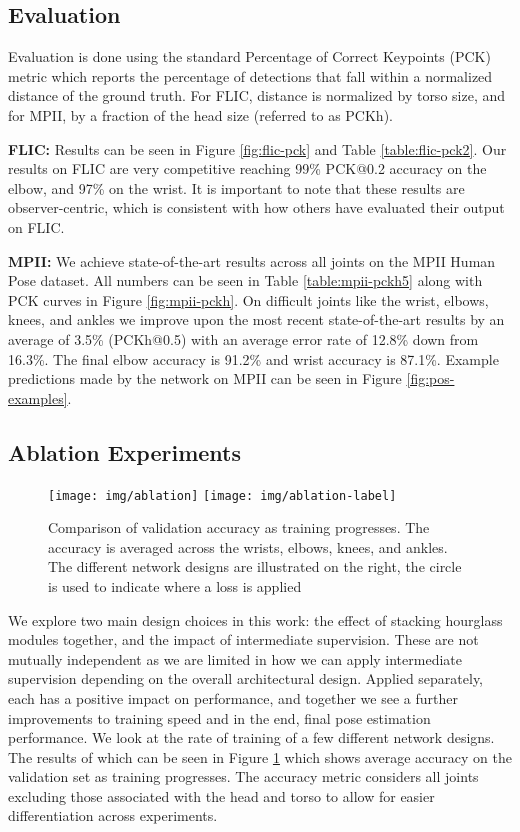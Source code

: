 \documentclass[runningheads]{llncs}
\begin{document}
\subsection{Evaluation}

Evaluation is done using the standard Percentage of Correct Keypoints
(PCK) metric which reports the percentage of detections that fall
within a normalized distance of the ground truth. For FLIC, distance
is normalized by torso size, and for MPII, by a fraction of the head
size (referred to as PCKh).

\textbf{FLIC:} Results can be seen in Figure \ref{fig:flic-pck} and
Table \ref{table:flic-pck2}.  Our results on FLIC are very competitive
reaching 99\% PCK@0.2 accuracy on the elbow, and 97\% on the wrist. It
is important to note that these results are observer-centric, which is
consistent with how others have evaluated their output on
FLIC.

\textbf{MPII:} We achieve state-of-the-art results across all joints
on the MPII Human Pose dataset. All numbers can be seen in Table
\ref{table:mpii-pckh5} along with PCK curves in Figure
\ref{fig:mpii-pckh}. On difficult joints like the wrist, elbows,
knees, and ankles we improve upon the most recent state-of-the-art
results by an average of 3.5\% (PCKh@0.5) with an average error rate
of 12.8\% down from 16.3\%. The final elbow accuracy is 91.2\% and
wrist accuracy is 87.1\%. Example predictions made by the network on
MPII can be seen in Figure \ref{fig:pos-examples}.

\subsection{Ablation Experiments}

\begin{figure}[t]
\centering
\texttt{[image: img/ablation]}
\texttt{[image: img/ablation-label]}
\caption{ Comparison of validation accuracy as training
  progresses. The accuracy is averaged across the wrists, elbows,
  knees, and ankles. The different network designs are illustrated on
  the right, the circle is used to indicate where a loss is applied}
\label{fig:ablation}
\end{figure}

We explore two main design choices in this work: the effect of
stacking hourglass modules together, and the impact of intermediate
supervision. These are not mutually independent as we are limited in
how we can apply intermediate supervision depending on the overall
architectural design. Applied separately, each has a positive impact
on performance, and together we see a further improvements to training
speed and in the end, final pose estimation performance. We look at
the rate of training of a few different network designs. The results
of which can be seen in Figure \ref{fig:ablation} which shows average
accuracy on the validation set as training progresses. The accuracy
metric considers all joints excluding those associated with the head
and torso to allow for easier differentiation across experiments.
\end{document}
